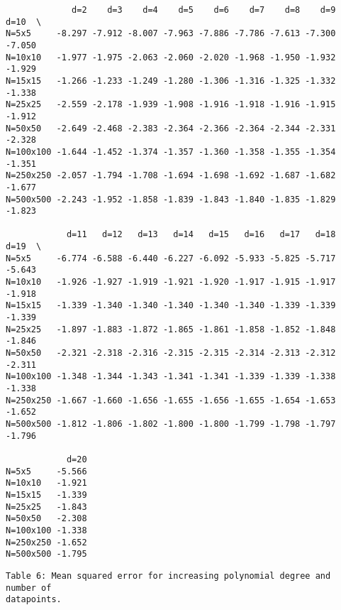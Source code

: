\documentclass[11pt]{article}
\begin{document}
    
    \begin{verbatim}
             d=2    d=3    d=4    d=5    d=6    d=7    d=8    d=9   d=10  \
N=5x5     -8.297 -7.912 -8.007 -7.963 -7.886 -7.786 -7.613 -7.300 -7.050   
N=10x10   -1.977 -1.975 -2.063 -2.060 -2.020 -1.968 -1.950 -1.932 -1.929   
N=15x15   -1.266 -1.233 -1.249 -1.280 -1.306 -1.316 -1.325 -1.332 -1.338   
N=25x25   -2.559 -2.178 -1.939 -1.908 -1.916 -1.918 -1.916 -1.915 -1.912   
N=50x50   -2.649 -2.468 -2.383 -2.364 -2.366 -2.364 -2.344 -2.331 -2.328   
N=100x100 -1.644 -1.452 -1.374 -1.357 -1.360 -1.358 -1.355 -1.354 -1.351   
N=250x250 -2.057 -1.794 -1.708 -1.694 -1.698 -1.692 -1.687 -1.682 -1.677   
N=500x500 -2.243 -1.952 -1.858 -1.839 -1.843 -1.840 -1.835 -1.829 -1.823   

            d=11   d=12   d=13   d=14   d=15   d=16   d=17   d=18   d=19  \
N=5x5     -6.774 -6.588 -6.440 -6.227 -6.092 -5.933 -5.825 -5.717 -5.643   
N=10x10   -1.926 -1.927 -1.919 -1.921 -1.920 -1.917 -1.915 -1.917 -1.918   
N=15x15   -1.339 -1.340 -1.340 -1.340 -1.340 -1.340 -1.339 -1.339 -1.339   
N=25x25   -1.897 -1.883 -1.872 -1.865 -1.861 -1.858 -1.852 -1.848 -1.846   
N=50x50   -2.321 -2.318 -2.316 -2.315 -2.315 -2.314 -2.313 -2.312 -2.311   
N=100x100 -1.348 -1.344 -1.343 -1.341 -1.341 -1.339 -1.339 -1.338 -1.338   
N=250x250 -1.667 -1.660 -1.656 -1.655 -1.656 -1.655 -1.654 -1.653 -1.652   
N=500x500 -1.812 -1.806 -1.802 -1.800 -1.800 -1.799 -1.798 -1.797 -1.796   

            d=20  
N=5x5     -5.566  
N=10x10   -1.921  
N=15x15   -1.339  
N=25x25   -1.843  
N=50x50   -2.308  
N=100x100 -1.338  
N=250x250 -1.652  
N=500x500 -1.795  
    \end{verbatim}

    
    \begin{Verbatim}[commandchars=\\\{\}]
Table 6: Mean squared error for increasing polynomial degree and number of
datapoints.
    \end{Verbatim}
\end{document}
